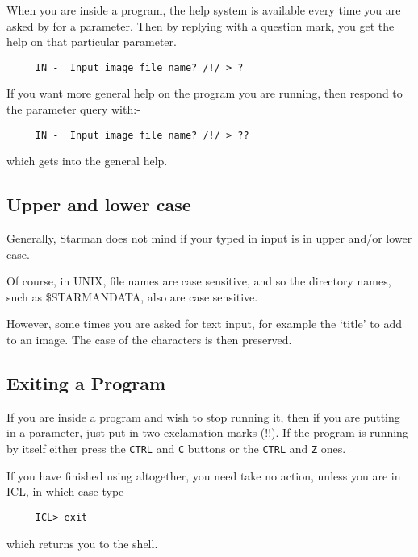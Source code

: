When you are inside a program, the help system is available every time
you are asked by \starman for a parameter. Then by replying with a
question mark, you get the help on that particular parameter.

\begin{verbatim}
     IN -  Input image file name? /!/ > ?  \end{verbatim}

If you want more general help on the program you are running, then
respond to the parameter query with:-

\begin{verbatim}
     IN -  Input image file name? /!/ > ??  \end{verbatim}

which gets into the general \starman help.

\subsection{Upper and lower case}

 Generally, Starman does not mind if your typed in input is in upper
 and/or lower case.

 Of course, in UNIX, file names are case sensitive, and so the
 directory names, such as {\$}STARMAN{\undersc}DATA, also are case
 sensitive.

 However, some times you are asked for text input, for example the
 `title' to add to an image. The case of the characters is then
 preserved.

\subsection{Exiting a Program }

If you are inside a \starman program and wish to stop running it, then
if you are putting in a parameter, just put in two exclamation marks
(!!). If the program is running by itself either press the {\tt CTRL}
and {\tt C} buttons or the {\tt CTRL} and {\tt Z} ones.

If you have finished using \starman altogether, you need take no
action, unless you are in ICL, in which case type

\begin{verbatim}
     ICL> exit \end{verbatim}

which returns you to the shell.





